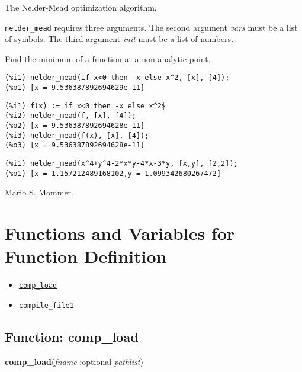 \documentclass[]{article}
\begin{document}
\vspace{5 pt}
The Nelder-Mead optimization algorithm. 

\vspace{5 pt}

   {\tt nelder\_mead} requires three arguments.
    The second argument {\it vars} must be a list of symbols.
    The third argument {\it init} must be a list of numbers.


\vspace{5 pt}


   Find the minimum of a function at a non-analytic point. 

\begin{Verbatim}[frame=single]
(%i1) nelder_mead(if x<0 then -x else x^2, [x], [4]);
(%o1) [x = 9.536387892694629e-11]
\end{Verbatim}

\begin{Verbatim}[frame=single]
(%i1) f(x) := if x<0 then -x else x^2$
(%i2) nelder_mead(f, [x], [4]);
(%o2) [x = 9.536387892694628e-11]
(%i3) nelder_mead(f(x), [x], [4]);
(%o3) [x = 9.536387892694628e-11]
\end{Verbatim}

\begin{Verbatim}[frame=single]
(%i1) nelder_mead(x^4+y^4-2*x*y-4*x-3*y, [x,y], [2,2]);
(%o1) [x = 1.157212489168102,y = 1.099342680267472]
\end{Verbatim}


Mario S. Mommer.

\vspace{5 pt}


\section{Functions and Variables for Function Definition}
\begin{itemize}
\item \hyperlink{comp_load}{{\tt comp\_load}}
\item \hyperlink{compile_file1}{{\tt compile\_file1}}
\end{itemize}
\subsection{Function: comp\_load\label{sec:comp_load}}
\hypertarget{comp_load}{}
{\bf comp\_load}({\it fname} :optional {\it pathlist})
\end{document}
